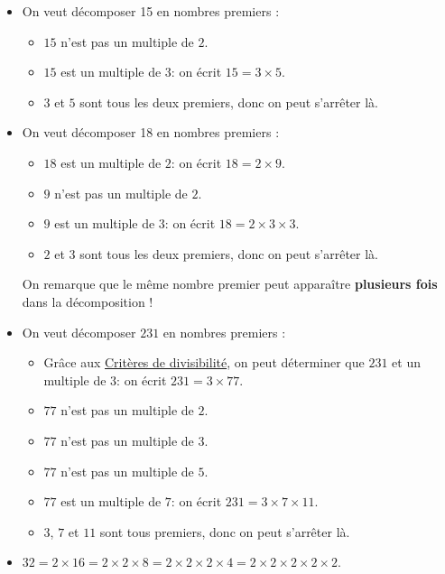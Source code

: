 \documentclass[../€Cours-complet/Cours-complet]{subfiles}
\begin{document}
\begin{exemple}
	\begin{itemize}
		\item On veut décomposer 15 en nombres premiers :
		      \begin{itemize}
			      \item $15$ n'est pas un multiple de $2$.
			      \item $15$ est un multiple de $3$: on écrit $15 = 3 × 5$.
			      \item $3$ et $5$ sont tous les deux premiers, donc on peut s'arrêter là.
		      \end{itemize}
		\item On veut décomposer 18 en nombres premiers :
		      \begin{itemize}
			      \item $18$ est un multiple de $2$: on écrit $18 = 2 × 9$.
			      \item $9$ n'est pas un multiple de $2$.
			      \item $9$ est un multiple de $3$: on écrit $18 = 2 × 3 × 3$.
			      \item $2$ et $3$ sont tous les deux premiers, donc on peut s'arrêter là.
		      \end{itemize}
		      On remarque que le même nombre premier peut apparaître \textbf{plusieurs fois} dans la décomposition !
		\item On veut décomposer $231$ en nombres premiers :
		      \begin{itemize}
			      \item Grâce aux \hyperref[cours:criteres-de-divisibilite]{Critères de divisibilité}, on peut déterminer que $231$ et un multiple de $3$: on écrit $231 = 3 × 77$.
			      \item $77$ n'est pas un multiple de $2$.
			      \item $77$ n'est pas un multiple de $3$.
			      \item $77$ n'est pas un multiple de $5$.
			      \item $77$ est un multiple de $7$: on écrit $231 = 3 × 7 × 11$.
			      \item $3$, $7$ et $11$ sont tous premiers, donc on peut s'arrêter là.
		      \end{itemize}
		\item $32 = 2 × 16 = 2 × 2 × 8 = 2 × 2 × 2 × 4 = 2 × 2 × 2 × 2 × 2$.
	\end{itemize}
\end{exemple}
\end{document}
